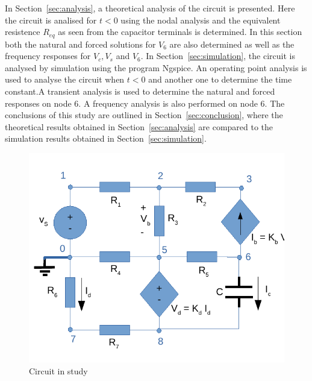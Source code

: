In Section~\ref{sec:analysis}, a theoretical analysis of the circuit is
presented. Here the circuit is analised for $t<0$ using the nodal analysis and the equivalent resistence $R_{eq}$ as seen from the capacitor terminals is determined. In this section both the natural and forced solutions for $V_6$ are also determined as well as the frequency responses for $V_c, V_s$ and $V_6 $. In Section~\ref{sec:simulation}, the circuit is analysed by
simulation using the program Ngspice. An operating point analysis is used to analyse the circuit when $t<0$ and another one to determine the time constant.A transient analysis is used to determine the natural and forced responses on node 6. A frequency analysis is also performed on node 6. The conclusions of this study are outlined in
Section~\ref{sec:conclusion}, where the theoretical results obtained in
Section~\ref{sec:analysis} are compared to the simulation results obtained in
Section~\ref{sec:simulation}.

\begin{figure}[h] \centering
\includegraphics[width=0.6\linewidth]{circuit_t2.pdf}
\caption{Circuit in study}
\label{fig:circuit_t2}
\end{figure}




